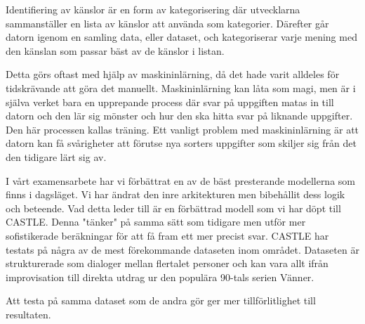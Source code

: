 \documentclass{popsci}
\begin{document}
{\noindent 

Identifiering av känslor är en form av kategorisering där utvecklarna sammanställer en lista av känslor att använda som kategorier. Därefter går datorn igenom en samling data, eller dataset, och kategoriserar varje mening med den känslan som passar bäst av de känslor i listan. 


Detta görs oftast med hjälp av maskininlärning, då det hade varit alldeles för tidskrävande att göra det manuellt. Maskininlärning kan låta som magi, men är i själva verket bara en upprepande process där svar på uppgiften matas in till datorn och den lär sig mönster och hur den ska hitta svar på liknande uppgifter. Den här processen kallas träning.  Ett vanligt problem med maskininlärning är att datorn kan få svårigheter att förutse nya sorters uppgifter som skiljer sig från det den tidigare lärt sig av. 




I vårt examensarbete har vi förbättrat en av de bäst presterande modellerna som finns i dagsläget. Vi har ändrat den inre arkitekturen men bibehållit dess logik och beteende. Vad detta leder till är en förbättrad modell som vi har döpt till CASTLE. Denna "tänker" på samma sätt som tidigare men utför mer sofistikerade beräkningar för att få fram ett mer precist svar. CASTLE har testats på några av de mest förekommande dataseten inom området. Dataseten är strukturerade som dialoger mellan flertalet personer och kan vara allt ifrån improvisation till direkta utdrag ur den populära 90-tals serien Vänner. 

Att testa på samma dataset som de andra gör ger mer tillförlitlighet till resultaten. 




}
\end{document}
